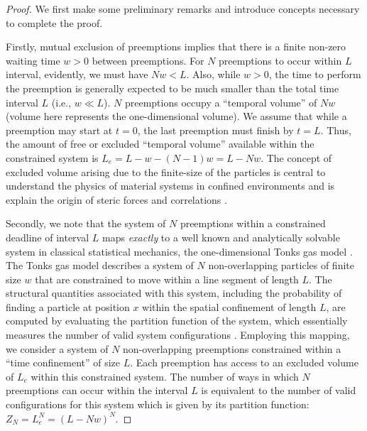 \begin{proof} 
We first make some preliminary remarks and introduce concepts necessary to complete the proof. 

Firstly, mutual exclusion of preemptions implies that there is a finite non-zero waiting time $w>0$ between preemptions. 
For $N$ preemptions to occur within $L$ interval, evidently, we must have $Nw < L$. Also, while $w >0$, the time to perform the preemption is generally expected to be much smaller than the total time interval $L$ (i.e., $w \ll L$).
$N$ preemptions occupy a ``temporal volume'' of $Nw$ (volume here represents the one-dimensional volume). We assume that while a preemption may start at $t=0$, the last preemption must finish by $t = L$. Thus, the amount of free or excluded ``temporal volume'' available within the constrained system is $L_e = L - w - (N-1)w = L - Nw$.
The concept of excluded volume arising due to the finite-size of the particles is central to understand the physics of material systems in confined environments and is explain the origin of steric forces and correlations \cite{krauth2006statistical,jing2015ionic,solis2013generating}. 

Secondly, we note that the system of $N$ preemptions within a constrained deadline of interval $L$ maps \emph{exactly} to a well known and analytically solvable system in classical statistical mechanics, the one-dimensional Tonks gas model \cite{tonks}. The Tonks gas model describes a system of $N$ non-overlapping particles of finite size $w$ that are constrained to move within a line segment of length $L$. The structural quantities associated with this system, including the probability of finding a particle at position $x$ within the spatial confinement of length $L$, are computed by evaluating the partition function of the system, which essentially measures the number of valid system configurations \cite{krauth2006statistical}. 
Employing this mapping, we consider a system of $N$ non-overlapping preemptions constrained within a ``time confinement'' of size $L$. Each preemption has access to an excluded volume of $L_e$ within this constrained system. 
The number of ways in which $N$ preemptions can occur within the interval $L$ is equivalent to the number of valid configurations for this system which is given by its partition function: $Z_N = L_e^N = (L- Nw)^N$.


\end{proof}

